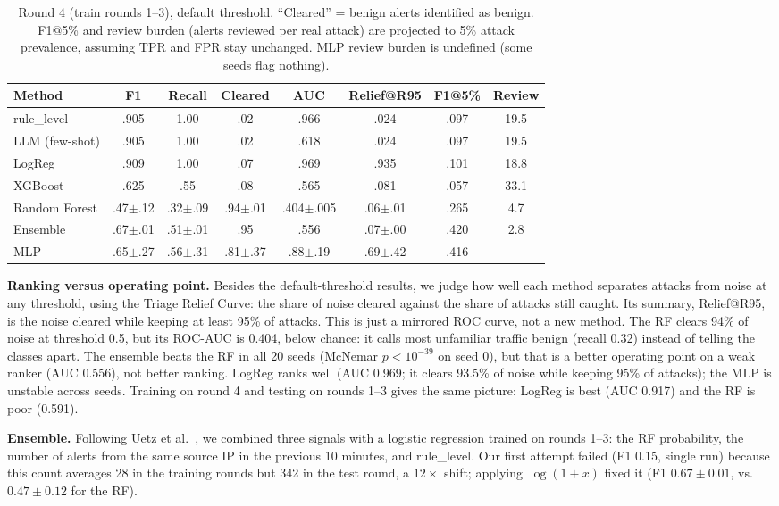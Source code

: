 \documentclass[conference]{IEEEtran}
\begin{document}
\begin{table}[t]
\centering
\caption{Round 4 (train rounds 1--3), default threshold. ``Cleared'' = benign alerts
identified as benign. F1@5\% and review burden (alerts reviewed per real attack) are projected
to 5\% attack prevalence, assuming TPR and FPR stay unchanged. MLP review burden is undefined (some seeds flag nothing).}
\label{tab:main}
\begin{tabular}{@{}lccccccc@{}}
\toprule
Method & F1 & Recall & Cleared & AUC & Relief@R95 & F1@5\% & Review \\
\midrule
rule\_level & .905 & 1.00 & .02 & .966 & .024 & .097 & 19.5 \\
LLM (few-shot) & .905 & 1.00 & .02 & .618 & .024 & .097 & 19.5 \\
LogReg & .909 & 1.00 & .07 & .969 & .935 & .101 & 18.8 \\
XGBoost & .625 & .55 & .08 & .565 & .081 & .057 & 33.1 \\
Random Forest & .47$\pm$.12 & .32$\pm$.09 & .94$\pm$.01 & .404$\pm$.005 & .06$\pm$.01 & .265 & 4.7 \\
Ensemble & .67$\pm$.01 & .51$\pm$.01 & .95 & .556 & .07$\pm$.00 & .420 & 2.8 \\
MLP & .65$\pm$.27 & .56$\pm$.31 & .81$\pm$.37 & .88$\pm$.19 & .69$\pm$.42 & .416 & -- \\
\bottomrule
\end{tabular}
\end{table}

\textbf{Ranking versus operating point.} Besides the default-threshold results, we judge how
well each method separates attacks from noise at any threshold, using the Triage Relief Curve: the
share of noise cleared against the share of attacks still caught. Its summary, Relief@R95, is the
noise cleared while keeping at least 95\% of attacks. This is just a mirrored ROC curve, not a new
method. The RF clears 94\% of noise at threshold 0.5, but its ROC-AUC is 0.404, below chance: it
calls most unfamiliar traffic benign (recall 0.32) instead of telling the classes apart. The
ensemble beats the RF in all 20 seeds (McNemar $p<10^{-39}$ on seed 0), but that is a better
operating point on a weak ranker (AUC 0.556), not better ranking. LogReg ranks well (AUC 0.969; it clears 93.5\% of
noise while keeping 95\% of attacks); the MLP is unstable across seeds. Training on round 4 and testing on rounds
1--3 gives the same picture: LogReg is best (AUC 0.917) and the RF is poor (0.591).

\textbf{Ensemble.} Following Uetz et al.~\cite{uetz2026}, we combined three signals with a logistic regression
trained on rounds 1--3: the RF probability, the number of alerts from the same source IP in the
previous 10 minutes, and rule\_level. Our first attempt failed (F1 0.15, single run) because this count averages 28 in the training rounds but 342
in the test round, a $12\times$ shift; applying $\log(1+x)$ fixed it (F1 $0.67\pm0.01$, vs.\ $0.47\pm0.12$ for the RF).
\end{document}
